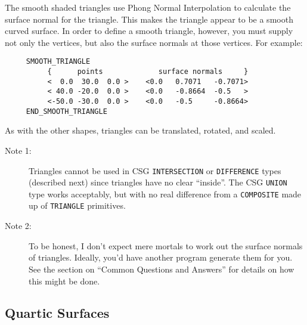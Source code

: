 The smooth shaded triangles
use Phong Normal Interpolation to calculate the
surface normal for the triangle.  This makes the triangle appear to be a
smooth curved surface.  In order to define a smooth triangle, however, you
must supply not only the vertices, but also the surface normals at those
vertices.  For example:
\begin{verbatim}
     SMOOTH_TRIANGLE
          {      points             surface normals     }
          <  0.0  30.0  0.0 >    <0.0   0.7071   -0.7071>
          < 40.0 -20.0  0.0 >    <0.0   -0.8664  -0.5   >
          <-50.0 -30.0  0.0 >    <0.0   -0.5     -0.8664>
     END_SMOOTH_TRIANGLE
\end{verbatim}
As with the other shapes, triangles can be translated, rotated, and scaled.

\begin{description}
\item[Note 1:] Triangles cannot be used in CSG {\tt INTERSECTION}
or {\tt DIFFERENCE} types (described next) since triangles have no
clear ``inside''.
The CSG {\tt UNION} type works acceptably, but with no real
difference from a {\tt COMPOSITE} made up of {\tt TRIANGLE} primitives.
\item[Note 2:] To be honest, I don't expect mere mortals to work out
the surface normals of triangles.
Ideally, you'd have another program
generate them for you.  See the section on ``Common Questions and
Answers'' for details on how this might be done.
\end{description}

\subsection{Quartic Surfaces}

